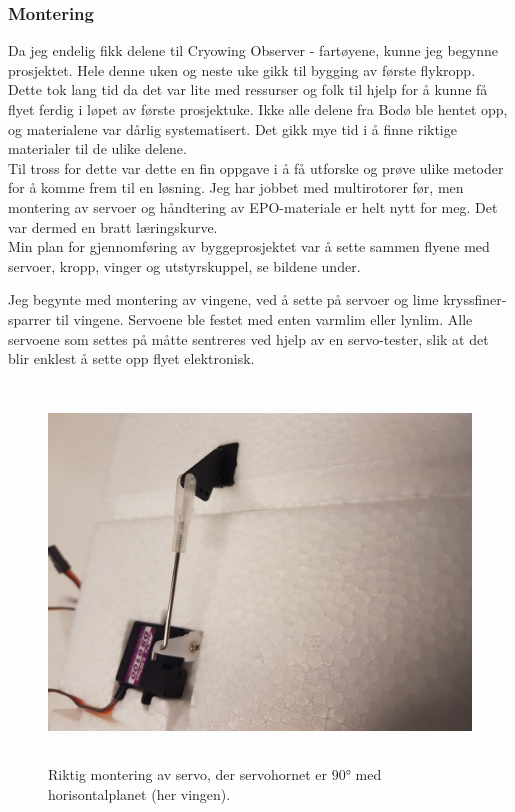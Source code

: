 \documentclass[12pt, a4paper]{article}
\begin{document}
\subsubsection{Montering}
Da jeg endelig fikk delene til Cryowing Observer - fartøyene, kunne jeg begynne prosjektet. Hele denne uken og neste uke gikk til bygging av første flykropp. Dette tok lang tid da det var lite med ressurser og folk til hjelp for å kunne få flyet ferdig i løpet av første prosjektuke. Ikke alle delene fra Bodø ble hentet opp, og materialene var dårlig systematisert. Det gikk mye tid i å finne riktige materialer til de ulike delene.\\
Til tross for dette var dette en fin oppgave i å få utforske og prøve ulike metoder for å komme frem til en løsning. Jeg har jobbet med multirotorer før, men montering av servoer og håndtering av EPO-materiale er helt nytt for meg. Det var dermed en bratt læringskurve. \\ Min plan for gjennomføring av byggeprosjektet var å sette sammen flyene med servoer, kropp, vinger og utstyrskuppel, se bildene under.

Jeg begynte med montering av vingene, ved å sette på servoer og lime kryssfiner-sparrer til vingene. Servoene ble festet med enten varmlim eller lynlim. Alle servoene som settes på måtte sentreres ved hjelp av en servo-tester, slik at det blir enklest å sette opp flyet elektronisk. 

\begin{figure}[ht]
	\centering
	\includegraphics[height = 10cm, width = .6\textwidth]{bilder/servomontering.jpg}
	\caption[Servoorientering]{Riktig montering av servo, der servohornet er \ang{90} med horisontalplanet (her vingen).}
\end{figure}
\end{document}
